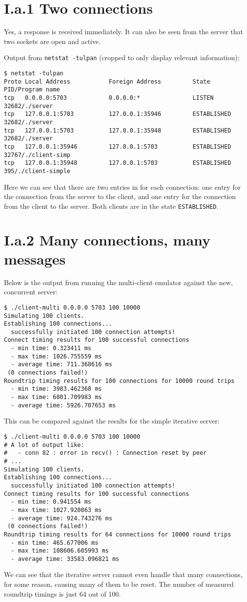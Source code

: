 \documentclass{article}
\begin{document}
\section*{I.a.1 Two connections}
Yes, a response is received immediately. It can also be seen from the server that two sockets are open and active.

Output from \texttt{netstat -tulpan} (cropped to only display relevant information):
\begin{verbatim}
$ netstat -tulpan
Proto Local Address           Foreign Address         State       PID/Program name
tcp   0.0.0.0:5703            0.0.0.0:*               LISTEN      32682/./server
tcp   127.0.0.1:5703          127.0.0.1:35946         ESTABLISHED 32682/./server
tcp   127.0.0.1:5703          127.0.0.1:35948         ESTABLISHED 32682/./server
tcp   127.0.0.1:35946         127.0.0.1:5703          ESTABLISHED 32767/./client-simp
tcp   127.0.0.1:35948         127.0.0.1:5703          ESTABLISHED 395/./client-simple
\end{verbatim}
Here we can see that there are two entries in for each connection: one entry for the connection from the server to the client, and one entry for the connection from the client to the server. Both clients are in the state \texttt{ESTABLISHED}.

\section*{I.a.2 Many connections, many messages}
Below is the output from running the multi-client emulator against the new, concurrent server:
\begin{verbatim}
$ ./client-multi 0.0.0.0 5703 100 10000
Simulating 100 clients.
Establishing 100 connections...
  successfully initiated 100 connection attempts!
Connect timing results for 100 successful connections
  - min time: 0.323411 ms
  - max time: 1026.755559 ms
  - average time: 711.368616 ms
 (0 connections failed!)
Roundtrip timing results for 100 connections for 10000 round trips
  - min time: 3983.462368 ms
  - max time: 6801.709983 ms
  - average time: 5926.707653 ms
\end{verbatim}
This can be compared against the results for the simple iterative server:
\begin{verbatim}
$ ./client-multi 0.0.0.0 5703 100 10000
# A lot of output like:
#   - conn 82 : error in recv() : Connection reset by peer
# ...
Simulating 100 clients.
Establishing 100 connections...
  successfully initiated 100 connection attempts!
Connect timing results for 100 successful connections
  - min time: 0.941554 ms
  - max time: 1027.920863 ms
  - average time: 924.743276 ms
 (0 connections failed!)
Roundtrip timing results for 64 connections for 10000 round trips
  - min time: 465.677006 ms
  - max time: 108606.605993 ms
  - average time: 33583.096821 ms
\end{verbatim}
We can see that the iterative server cannot even handle that many connections, for some reason, causing many of them to be reset. The number of measured roundtrip timings is just 64 out of 100.
\end{document}
